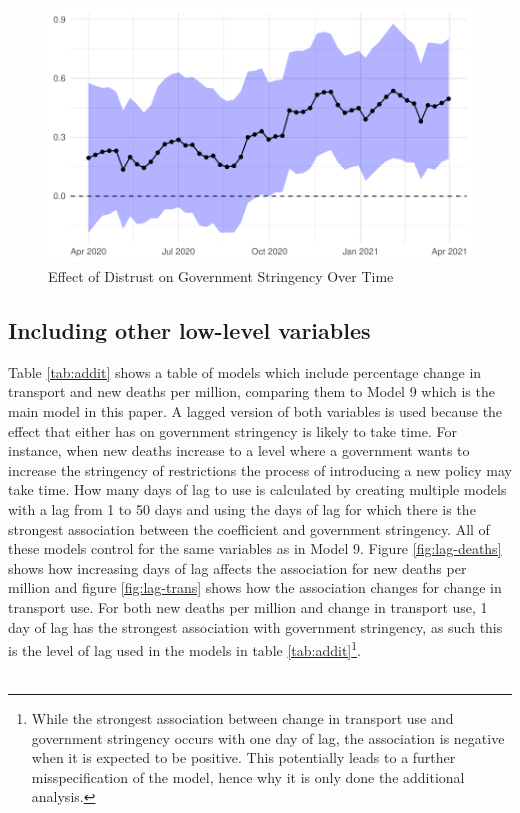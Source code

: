\documentclass[
  12pt,
]{article}
\begin{document}
\begin{figure}
\includegraphics[width=0.8\linewidth]{write_up_test_files/figure-latex/over-time-1} \caption{Effect of Distrust on Government Stringency Over Time}\label{fig:over-time}
\end{figure}

\hypertarget{including-other-low-level-variables}{%
\subsection{Including other low-level variables}\label{including-other-low-level-variables}}

Table \ref{tab:addit} shows a table of models which include percentage change in transport and new deaths per million, comparing them to Model 9 which is the main model in this paper. A lagged version of both variables is used because the effect that either has on government stringency is likely to take time. For instance, when new deaths increase to a level where a government wants to increase the stringency of restrictions the process of introducing a new policy may take time. How many days of lag to use is calculated by creating multiple models with a lag from 1 to 50 days and using the days of lag for which there is the strongest association between the coefficient and government stringency. All of these models control for the same variables as in Model 9. Figure \ref{fig:lag-deaths} shows how increasing days of lag affects the association for new deaths per million and figure \ref{fig:lag-trans} shows how the association changes for change in transport use. For both new deaths per million and change in transport use, 1 day of lag has the strongest association with government stringency, as such this is the level of lag used in the models in table \ref{tab:addit}\footnote{While the strongest association between change in transport use and government stringency occurs with one day of lag, the association is negative when it is expected to be positive. This potentially leads to a further misspecification of the model, hence why it is only done the additional analysis.}.\\
~\\
\end{document}
